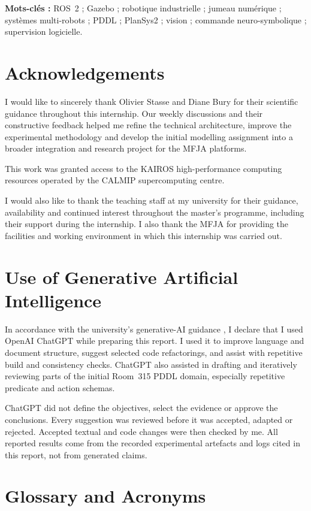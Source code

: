 \textbf{Mots-clés :} ROS~2 ; Gazebo ; robotique industrielle ; jumeau
numérique ; systèmes multi-robots ; PDDL ; PlanSys2 ; vision ; commande
neuro-symbolique ; supervision logicielle.

\cleardoublepage
\chapter*{Acknowledgements}
I would like to sincerely thank Olivier Stasse and Diane Bury for their
scientific guidance throughout this internship. Our weekly discussions and
their constructive feedback helped me refine the technical architecture,
improve the experimental methodology and develop the initial modelling
assignment into a broader integration and research project for the MFJA
platforms.

This work was granted access to the KAIROS high-performance computing resources
operated by the CALMIP supercomputing centre.

I would also like to thank the teaching staff at my university for their
guidance, availability and continued interest throughout the master's
programme, including their support during the internship. I also thank the
MFJA for providing the facilities and working environment in which this
internship was carried out.

\cleardoublepage
\chapter*{Use of Generative Artificial Intelligence}
In accordance with the university's generative-AI guidance
\citep[p.~17]{evryreportinstructions2026}, I declare that I used OpenAI
ChatGPT \citep{openaichatgptfaq} while preparing this report. I used it to
improve language and document structure, suggest selected code refactorings,
and assist with repetitive build and consistency checks. ChatGPT also assisted
in drafting and iteratively reviewing parts of the initial Room~315 PDDL
domain, especially repetitive predicate and action schemas.

ChatGPT did not define the objectives, select the evidence or approve the
conclusions. Every suggestion was reviewed before it was accepted, adapted or
rejected. Accepted textual and code changes were then checked by me. All
reported results come from the recorded experimental artefacts and logs cited
in this report, not from generated claims.
\vfill

\cleardoublepage
\chapter*{Glossary and Acronyms}
